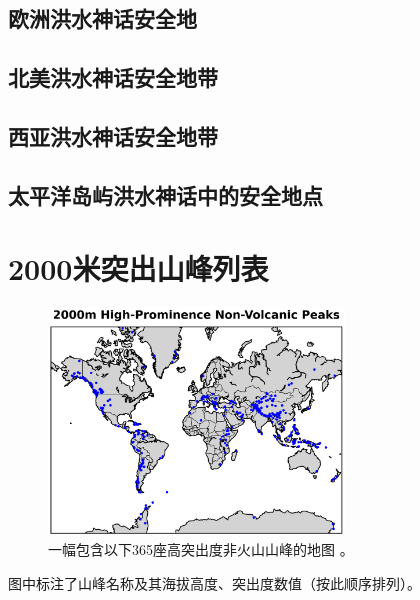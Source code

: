 \documentclass[10pt,twocolumn,letterpaper]{article}
\begin{document}
\subsection{欧洲洪水神话安全地}
\subsection{北美洪水神话安全地带}

\subsection{西亚洪水神话安全地带}
\subsection{太平洋岛屿洪水神话中的安全地点}

\clearpage
\twocolumn
\section{2000米突出山峰列表}

\begin{figure}[t]
\begin{center}
\includegraphics[width=0.7\textwidth]{peaks.png}
\end{center}
   \caption{一幅包含以下365座高突出度非火山山峰的地图 \cite{62}。}
   \label{fig:22}
\end{figure}

图中标注了山峰名称及其海拔高度、突出度数值（按此顺序排列）。
\end{document}
